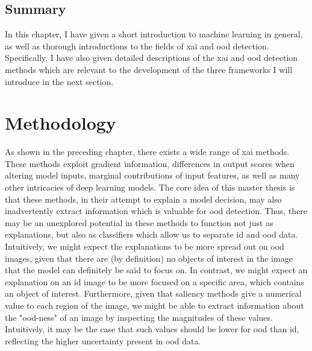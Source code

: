 \documentclass[UKenglish]{uiomasterthesis} %
\theoremstyle{definition}
\begin{document}
\section{Summary}

In this chapter, I have given a short introduction to machine learning in general, as well as thorough introductions to the fields of \ac{xai} and \ac{ood} detection. Specifically, I have also given detailed descriptions of the \ac{xai} and \ac{ood} detection methods which are relevant to the development of the three frameworks I will introduce in the next section.

\chapter{Methodology} \label{chapter:methodology}

As shown in the preceding chapter, there exists a wide range of \ac{xai} methods. These methods exploit gradient information, differences in output scores when altering model inputs, marginal contributions of input features, as well as many other intricacies of deep learning models. The core idea of this master thesis is that these methods, in their attempt to explain a model decision, may also inadvertently extract information which is valuable for \ac{ood} detection. Thus, there may be an unexplored potential in these methods to function not just as explanations, but also as classifiers which allow us to separate \ac{id} and \ac{ood} data. Intuitively, we might expect the explanations to be more spread out on \ac{ood} images, given that there are (by definition) no objects of interest in the image that the model can definitely be said to focus on. In contrast, we might expect an explanation on an \ac{id} image to be more focused on a specific area, which contains an object of interest. Furthermore, given that saliency methods give a numerical value to each region of the image, we might be able to extract information about the "\ac{ood}-ness" of an image by inspecting the magnitudes of these values. Intuitively, it may be the case that such values should be lower for \ac{ood} than \ac{id}, reflecting the higher uncertainty present in \ac{ood} data.

\end{document}
